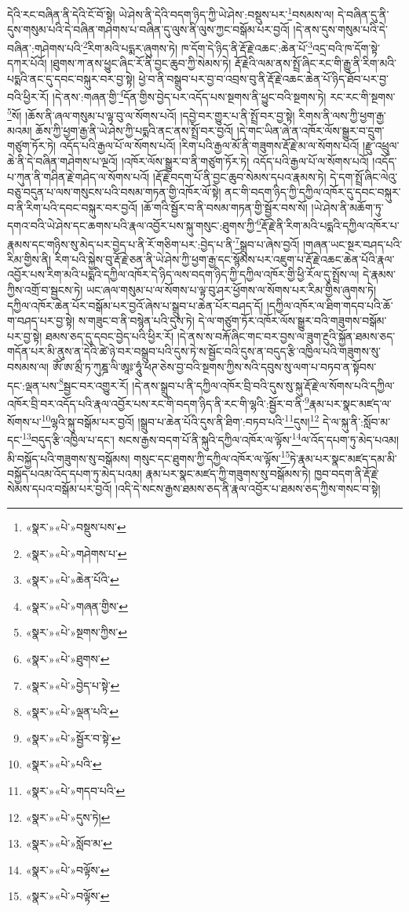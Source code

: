 དེའི་རང་བཞིན་ནི་དེའི་ངོ་བོ་སྟེ། ཡེ་ཤེས་ནི་དེའི་བདག་ཉིད་ཀྱི་ཡེ་ཤེས་:བསྡུས་པར་\footnote{«སྣར་»«པེ་»བསྡུས་པས་}བསམས་ལ། དེ་བཞིན་དུ་ནི་དུས་གསུམ་པའི་དེ་བཞིན་གཤེགས་པ་བཞིན་དུ་ལུས་ནི་ལུས་ཀྱང་བསྒོམ་པར་བྱའོ། །དེ་ནས་དུས་གསུམ་པའི་དེ་བཞིན་:གཤེགས་པའི་\footnote{«སྣར་»«པེ་»གཤེགས་པ་}རིག་མའི་པདྨར་ཞུགས་ཏེ། ཁ་དོག་དེ་ཉིད་ནི་རྡོ་རྗེ་འཆང་:ཆེན་པོ་\footnote{«སྣར་»«པེ་»ཆེན་པོའི་}འདྲ་བའི་ཁ་དོག་སྟེ་དཀར་པོའོ། །ཐུགས་ཀ་ནས་ཕྱུང་ཞིང་རོ་ནི་བྱང་ཆུབ་ཀྱི་སེམས་ཏེ། རྡོ་རྗེའི་ལམ་ནས་སྤྲོ་ཞིང་རང་གི་རྒྱུ་ནི་རིག་མའི་པདྨའི་ནང་དུ་དབང་བསྐུར་བར་བྱ་སྟེ། ཕྱེ་བ་ནི་བསྒྲུབ་པར་བྱ་བ་འབྲས་བུ་ནི་རྡོ་རྗེ་འཆང་ཆེན་པོ་ཉིད་ཐོབ་པར་བྱ་བའི་ཕྱིར་རོ། །དེ་ནས་:གཞན་གྱི་\footnote{«སྣར་»«པེ་»གཞན་གྱིས་}དོན་གྱིས་བྱེད་པར་འདོད་པས་སྔགས་ནི་ཕྱུང་བའི་སྔགས་ཏེ། རང་རང་གི་སྔགས་\footnote{«སྣར་»«པེ་»སྔགས་ཀྱིས་}སོ། །ཆོས་ནི་ཞལ་གསུམ་པ་ལྟ་བུ་ལ་སོགས་པའོ། །དབྱེ་བར་གྱུར་པ་ནི་སྤྲོ་བར་བྱ་སྟེ། རིགས་ནི་ལས་ཀྱི་ཕྱག་རྒྱ་མའམ། ཆོས་ཀྱི་ཕྱག་རྒྱ་ནི་ཡེ་ཤེས་ཀྱི་པདྨའི་ནང་ནས་སྤྲོ་བར་བྱའོ། །དེ་གང་ཡིན་ཞེ་ན་འཁོར་ལོས་སྒྱུར་བ་དྲུག་གཙུག་ཏོར་ཏེ། འདོད་པའི་རྒྱལ་པོ་ལ་སོགས་པའོ། །རིག་པའི་རྒྱལ་མོ་ནི་གཟུགས་རྡོ་རྗེ་མ་ལ་སོགས་པའོ། །རྫུ་འཕྲུལ་ཆེ་ནི་དེ་བཞིན་གཤེགས་པ་ལྔའོ། །འཁོར་ལོས་སྒྱུར་བ་ནི་གཙུག་ཏོར་ཏེ། འདོད་པའི་རྒྱལ་པོ་ལ་སོགས་པའོ། །འདོད་པ་ཀུན་ནི་གཤིན་རྗེ་གཤེད་ལ་སོགས་པའོ། །རྡོ་རྗེ་བདག་པོ་ནི་བྱང་ཆུབ་སེམས་དཔའ་རྣམས་ཏེ། དེ་དག་སྤྲོ་ཞིང་ལེའུ་བཅུ་བདུན་པ་ལས་གསུངས་པའི་བསམ་གཏན་གྱི་འཁོར་ལོ་སྟེ། ནང་གི་བདག་ཉིད་ཀྱི་དཀྱིལ་འཁོར་དུ་དབང་བསྐུར་བ་ནི་རིག་པའི་དབང་བསྐུར་བར་བྱའོ། །ཆོ་གའི་སྦྱོར་བ་ནི་བསམ་གཏན་གྱི་སྦྱོར་བས་སོ། །ཡེ་ཤེས་ནི་མཆོག་ཏུ་དགའ་བའི་ཡེ་ཤེས་དང་ཆགས་པའི་རྣལ་འབྱོར་པས་སྐུ་གསུང་:ཐུགས་ཀྱི་\footnote{«སྣར་»«པེ་»ཐུགས་}རྡོ་རྗེ་ནི་རིག་མའི་པདྨའི་དཀྱིལ་འཁོར་པ་རྣམས་དང་གཉིས་སུ་མེད་པར་བྱེད་པ་ནི་རོ་གཅིག་པར་:བྱེད་པ་ནི་\footnote{«སྣར་»«པེ་»བྱེད་པ་སྟེ་}སྒྲུབ་པ་ཞེས་བྱའོ། །གཞན་ཡང་སྔར་བཤད་པའི་རིམ་གྱིས་ནི། རིག་པའི་སྐྱེས་བུ་རྡོ་རྗེ་ཅན་ནི་ཡེ་ཤེས་ཀྱི་ཕྱག་རྒྱ་དང་སྙོམས་པར་འཇུག་པ་རྡོ་རྗེ་འཆང་ཆེན་པོའི་རྣལ་འབྱོར་པས་རིག་མའི་པདྨའི་དཀྱིལ་འཁོར་དེ་ཉིད་ལས་བདག་ཉིད་ཀྱི་དཀྱིལ་འཁོར་གྱི་ཕྱི་རོལ་དུ་སྤྲོས་ལ། དེ་རྣམས་ཀྱིས་འགྲོ་བ་སྦྱངས་ཏེ། ཡང་ཞལ་གསུམ་པ་ལ་སོགས་པ་ལྟ་བུ་ཤར་ཕྱོགས་ལ་སོགས་པར་རིམ་གྱིས་ཞུགས་ཏེ། དཀྱིལ་འཁོར་ཆེན་པོར་བསྒོམ་པར་བྱའོ་ཞེས་པ་སྒྲུབ་པ་ཆེན་པོར་བཤད་དོ། །དཀྱིལ་འཁོར་ལ་ཐིག་གདབ་པའི་ཆོ་ག་བཤད་པར་བྱ་སྟེ། ས་གཟུང་བ་ནི་བསྙེན་པའི་དུས་ཏེ། དེ་ལ་གཙུག་ཏོར་འཁོར་ལོས་སྒྱུར་བའི་གཟུགས་བསྒོམ་པར་བྱ་སྟེ། ཐམས་ཅད་དུ་དབང་བྱེད་པའི་ཕྱིར་རོ། །དེ་ནས་ས་བརྐོ་ཞིང་གང་བར་བྱས་ལ་ཟུག་རྔུའི་སྐྱོན་ཐམས་ཅད་གདོན་པར་མི་ནུས་ན་དེའི་ཚེ་ཉེ་བར་བསྒྲུབ་པའི་དུས་ཏེ་ས་སྦྱོང་བའི་དུས་ན་བདུད་རྩི་འཁྱིལ་པའི་གཟུགས་སུ་བསམས་ལ། ཨོཾ་ཨ་མྲྀ་ཏ་ཀུཎྜ་ལི་ཨཱཿ་ཧཱུཾ་ཕཊ་ཅེས་བྱ་བའི་སྔགས་ཀྱིས་སའི་དབུས་སུ་ལག་པ་བཏབ་ན་སྟོབས་དང་:ལྡན་པས་\footnote{«སྣར་»«པེ་»ལྡན་པའི་}སྦྱང་བར་འགྱུར་རོ། །དེ་ནས་སྒྲུབ་པ་ནི་དཀྱིལ་འཁོར་བྲི་བའི་དུས་སུ་སྐུ་རྡོ་རྗེ་ལ་སོགས་པའི་དཀྱིལ་འཁོར་བྲི་བར་འདོད་པའི་རྣལ་འབྱོར་པས་རང་གི་བདག་ཉིད་ནི་རང་གི་ལྷའི་:སྦྱོར་བ་ནི་\footnote{«སྣར་»«པེ་»སྦྱོར་བ་སྟེ་}རྣམ་པར་སྣང་མཛད་ལ་སོགས་པ་\footnote{«སྣར་»«པེ་»པའི་}ལྷའི་སྐུ་བསྒོམ་པར་བྱའོ། །སྒྲུབ་པ་ཆེན་པོའི་དུས་ནི་ཐིག་:བཏབ་པའི་\footnote{«སྣར་»«པེ་»གདབ་པའི་}དུས།\footnote{«སྣར་»«པེ་»དུས་ཏེ།} དེ་ལ་སྐུ་ནི་:སློབ་མ་དང་\footnote{«སྣར་»«པེ་»སློབ་མ་}བདུད་རྩི་འཁྱིལ་པ་དང་། སངས་རྒྱས་བདག་པོ་ནི་སྐུའི་དཀྱིལ་འཁོར་ལ་ལྟོས་\footnote{«སྣར་»«པེ་»བལྟོས་}ལ་འོད་དཔག་ཏུ་མེད་པའམ། མི་བསྐྱོད་པའི་གཟུགས་སུ་བསྒོམས། གསུང་དང་ཐུགས་ཀྱི་དཀྱིལ་འཁོར་ལ་ལྟོས་\footnote{«སྣར་»«པེ་»བལྟོས་}ཏེ་རྣམ་པར་སྣང་མཛད་དམ་མི་བསྐྱོད་པའམ་འོད་དཔག་ཏུ་མེད་པའམ། རྣམ་པར་སྣང་མཛད་ཀྱི་གཟུགས་སུ་བསྒོམས་ཏེ། ཁྱབ་བདག་ནི་རྡོ་རྗེ་སེམས་དཔའ་བསྒོམ་པར་བྱའོ། །འདི་དེ་སངས་རྒྱས་ཐམས་ཅད་ནི་རྣལ་འབྱོར་པ་ཐམས་ཅད་ཀྱིས་གསང་བ་སྟེ། 